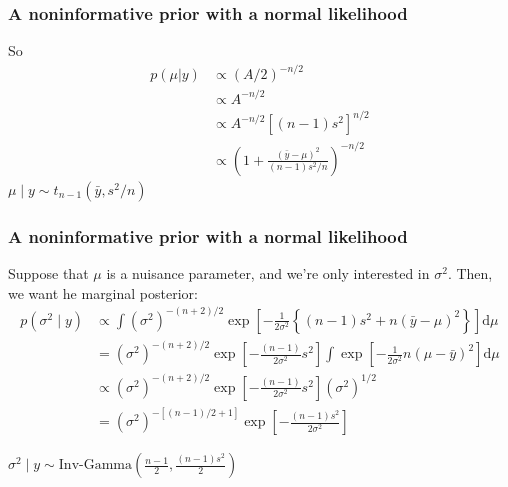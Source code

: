 \documentclass{beamer}
\begin{document}
\begin{frame}
\frametitle{A noninformative prior with a normal likelihood}

So
\begin{align*}
p(\mu | y) &\propto (A/2)^{-n/2} \\
&\propto A^{-n/2} \\
&\propto A^{-n/2}[(n-1)  s^2]^{n/2} \\
&\propto \left(1 + \frac{(\bar{y} - \mu)^2}{(n-1)  s^2/n} \right)^{-n/2} 
\end{align*}
$\mu \mid y \sim t_{n-1}(\bar{y}, s^2/n)$ 

\end{frame}


\begin{frame}
\frametitle{A noninformative prior with a normal likelihood}

Suppose that $\mu$ is a nuisance parameter, and we're only interested in $\sigma^2$. Then, we want he marginal posterior:
\begin{align*}
p(\sigma^2 \mid y) &\propto \int (\sigma^2)^{-(n+2)/2} \exp\left[ - \frac{1}{2\sigma^2}\left\{(n-1)  s^2 + n(\bar{y} - \mu)^2 \right\} \right] \text{d}\mu \\
&= (\sigma^2)^{-(n+2)/2}  \exp\left[ - \frac{(n-1)}{2\sigma^2}s^2  \right] \int \exp\left[ - \frac{1}{2\sigma^2} n(\mu - \bar{y} )^2 \right] \text{d}\mu \\
&\propto (\sigma^2)^{-(n+2)/2}  \exp\left[ - \frac{(n-1)}{2\sigma^2}s^2  \right] (\sigma^2)^{1/2} \\
&= (\sigma^2)^{-[(n-1)/2 + 1]}  \exp\left[ - \frac{(n-1)s^2}{2\sigma^2}  \right] 
\end{align*}

$\sigma^2 \mid y \sim \text{Inv-Gamma}\left(\frac{n-1}{2}, \frac{(n-1)s^2}{2}\right)$
\end{frame}
\end{document}
